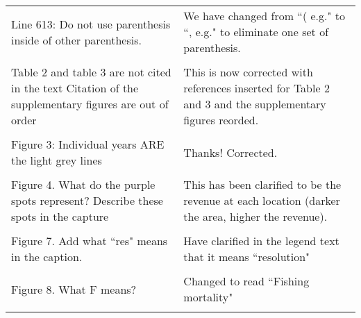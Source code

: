\documentclass[10pt]{letter}
\begin{document}
\begin{landscape}
\begin{center}
\begin{longtable}{p{12cm} | p{12cm}}
\\
Line 613: Do not use parenthesis inside of other parenthesis. & We have changed
from ``( e.g." to ``, e.g." to eliminate one set of parenthesis. \\
\\
Table 2 and table 3 are not cited in the text Citation of the supplementary
figures are out of order & This is now corrected with references inserted for
Table 2 and 3 and the supplementary figures reorded. \\
\\
Figure 3: Individual years ARE the light grey lines    & Thanks! Corrected. \\
\\
Figure 4. What do the purple spots represent? Describe these spots in the
capture & This has been clarified to be the revenue at each location (darker
the area, higher the revenue). \\
\\
Figure 7. Add what ``res"  means in the caption.  & Have clarified in the
legend text that it means ``resolution" \\
\\
Figure 8. What F means? & Changed to read ``Fishing mortality" \\
\\
		\bottomrule
	\end{longtable}

\end{center}

\end{landscape}
\end{document}
